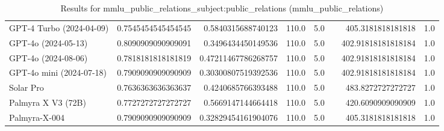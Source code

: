\begin{table}[htp]
{\begin{tabular}{lrrrrrrr}
GPT-4 Turbo (2024-04-09) & 0.7545454545454545 & 0.5840315688740123 & 110.0 & 5.0 &  & 405.3181818181818 & 1.0 \\
GPT-4o (2024-05-13) & 0.8090909090909091 & 0.3496434450149536 & 110.0 & 5.0 &  & 402.91818181818184 & 1.0 \\
GPT-4o (2024-08-06) & 0.7818181818181819 & 0.47211467786268757 & 110.0 & 5.0 &  & 402.91818181818184 & 1.0 \\
GPT-4o mini (2024-07-18) & 0.7909090909090909 & 0.30300807519392536 & 110.0 & 5.0 &  & 402.91818181818184 & 1.0 \\
Solar Pro & 0.7636363636363637 & 0.4240685766393488 & 110.0 & 5.0 &  & 483.8272727272727 & 1.0 \\
Palmyra X V3 (72B) & 0.7727272727272727 & 0.5669147144664418 & 110.0 & 5.0 &  & 420.6090909090909 & 1.0 \\
Palmyra-X-004 & 0.7909090909090909 & 0.32829454161904076 & 110.0 & 5.0 &  & 405.3181818181818 & 1.0 \\
\bottomrule
\end{tabular}}
\caption{Results for mmlu_public_relations_subject:public_relations (mmlu_public_relations)}
\label{fig:mmlu_public_relations_subject:public_relations (mmlu_public_relations)}
\end{table}
